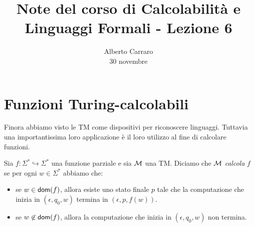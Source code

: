\documentclass[runningheads,a4paper]{llncs}
\begin{document}
\mainmatter  %

\title{Note del corso di Calcolabilit\`{a} e Linguaggi Formali - Lezione 6}


%
%
\author{Alberto Carraro \\ 30 novembre}
%


%
%




\maketitle

\section{Funzioni Turing-calcolabili}

Finora abbiamo visto le TM come dispositivi per riconoscere linguaggi. Tuttavia una importantissima loro applicazione \`{e} il loro utilizzo al fine di calcolare funzioni.

\begin{definition}\label{def:funz-Turing-Calc}
Sia $f: \Sigma^* \hookrightarrow \Sigma^*$ una funzione parziale e sia $\mathcal{M}$ una TM. Diciamo che $\mathcal{M}$ \emph{calcola} $f$ se per ogni $w \in \Sigma^*$ abbiamo che:
\begin{itemize}
\item se $w\in\mathsf{dom}(f)$, allora esiste uno stato finale $p$ tale che la computazione che inizia in $(\epsilon,q_0,w)$ termina in $(\epsilon,p,f(w))$.
\item se $w\not\in\mathsf{dom}(f)$, allora la computazione che inizia in $(\epsilon,q_0,w)$ non termina.
\end{itemize}
\end{definition}
\end{document}
